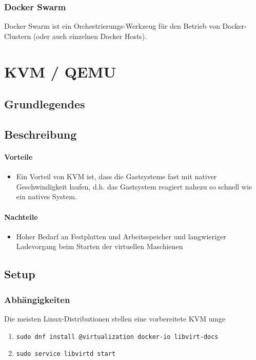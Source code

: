 \subsubsection{Docker Swarm}
Docker Swarm ist ein Orchestrierungs-Werkzeug für den Betrieb von Docker-Clustern (oder auch einzelnen Docker Hosts).


\section{KVM / QEMU}
\subsection{Grundlegendes}

\subsection{Beschreibung}
\paragraph{Vorteile}
\begin{itemize}
	\item Ein Vorteil von KVM ist, dass die Gastsysteme fast mit nativer Geschwindigkeit laufen, d.h. das Gastsystem reagiert nahezu so schnell wie ein natives System. 
\end{itemize}
\paragraph{Nachteile}
\begin{itemize}
	\item Hoher Bedarf an Festplatten und Arbeitsspeicher und langwieriger Ladevorgang beim Starten der virtuellen Maschienen
\end{itemize}

\subsection{Setup}
\subsubsection{Abhängigkeiten}
Die meisten Linux-Distributionen stellen eine vorbereitete KVM umge

\begin{enumerate}
	\item \lstinline|sudo dnf install @virtualization docker-io libvirt-docs|
	\item \lstinline|sudo service libvirtd start|
\end{enumerate}

